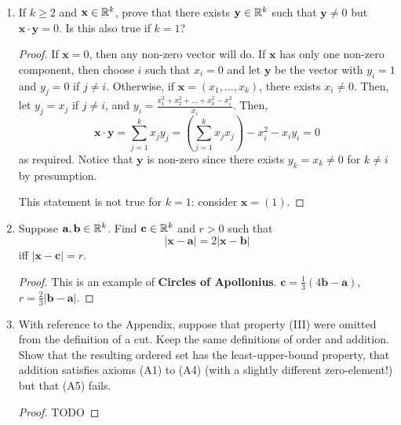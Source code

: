 \begin{enumerate}
\begin{proof}
The interpretation of this is that in a parallelogram, the sums of the squares of the lengths of the diagonals is equal to the sum of the squares of the lengths of the four sides.
\end{proof}

\item If $k \ge 2$ and $\textbf{x} \in \mathbb{R}^k$, prove that there exists $\textbf{y} \in \mathbb{R}^k$ such that $\textbf{y} \ne 0$ but $\textbf{x} \cdot \textbf{y} = 0$. Is this also true if $k = 1$?

\begin{proof}
If $\textbf{x} = 0$, then any non-zero vector will do. If $\textbf{x}$ has only one non-zero component, then choose $i$ such that $x_i = 0$ and let $\textbf{y}$ be the vector with $y_i = 1$ and $y_j = 0$ if $j \ne i$. Otherwise, if $\textbf{x} = (x_1, \dotsc, x_k)$, there exists $x_i \ne 0$. Then, let $y_j = x_j$ if $j \ne i$, and $y_i = \frac{x_1^2 + x_2^2 + \dotsc + x_k^2 - x_i^2}{x_i}$. Then, 
\[
	\textbf{x} \cdot \textbf{y} = \sum_{j=1}^{k} x_j y_j = \left(\sum_{j=1}^{k} x_j x_j\right) - x_i^2 - x_iy_i = 0
\]
as required. Notice that $\textbf{y}$ is non-zero since there exists $y_k = x_k \ne 0$ for $k \ne i$ by presumption.

This statement is not true for $k = 1$: consider $\textbf{x} = (1)$.
\end{proof}

\item Suppose $\textbf{a}, \textbf{b} \in \mathbb{R}^k$. Find $\textbf{c} \in \mathbb{R}^k$ and $r > 0$ such that
\[
	|\textbf{x} - \textbf{a}| = 2 |\textbf{x} - \textbf{b}|
\]
iff $|\textbf{x} - \textbf{c}| = r$.

\begin{proof}
This is an example of \textbf{Circles of Apollonius}. $\textbf{c} = \frac{1}{3} \left(4\textbf{b} - \textbf{a}\right)$, $r = \frac{2}{3} |\textbf{b} - \textbf{a}|$. 
\end{proof}

\item With reference to the Appendix, suppose that property (III) were omitted from the definition of a cut. Keep the same definitions of order and addition. Show that the resulting ordered set has the least-upper-bound property, that addition satisfies axioms (A1) to (A4) (with a slightly different zero-element!) but that (A5) fails.

\begin{proof}
TODO
\end{proof}
\end{enumerate}